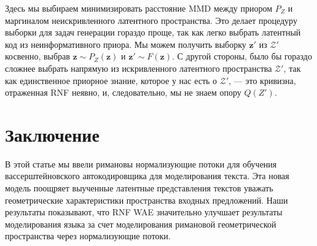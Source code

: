 \documentclass{article}
\begin{document}
Здесь мы выбираем минимизировать расстояние MMD между приором \(P_Z\) и маргиналом неискривленного латентного пространства. Это делает процедуру выборки для задач генерации гораздо проще, так как легко выбрать латентный код из неинформативного приора. Мы можем получить выборку \(\mathbf{z}'\) из \(\mathcal{Z}'\) косвенно, выбрав \(\mathbf{z} \sim P_Z(\mathbf{z})\) и \(\mathbf{z}' \sim F(\mathbf{z})\). С другой стороны, было бы гораздо сложнее выбрать напрямую из искривленного латентного пространства \(\mathcal{Z}'\), так как единственное приорное знание, которое у нас есть о \(\mathcal{Z}'\), — это кривизна, отраженная RNF неявно, и, следовательно, мы не знаем опору \(Q(Z')\).

\section{Заключение}
В этой статье мы ввели римановы нормализующие потоки для обучения вассерштейновского автокодировщика для моделирования текста. Эта новая модель поощряет выученные латентные представления текстов уважать геометрические характеристики пространства входных предложений. Наши результаты показывают, что RNF WAE значительно улучшает результаты моделирования языка за счет моделирования римановой геометрической пространства через нормализующие потоки.
\end{document}
